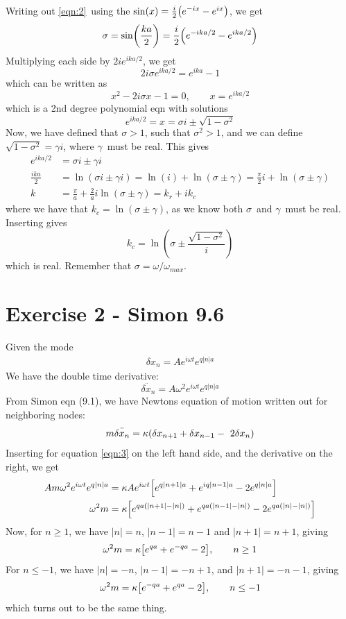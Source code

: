 \documentclass[12p,a4paper]{article}
\renewcommand{\exp}{e^}
\renewcommand{\exp}{e^}
\begin{document}
Writing out \ref{eqn:2} using the $\sin(x) = \frac{i}{2}\qty(\exp{-ix} - \exp{ix})$, we get
\[
    \sigma = \sin(\frac{ka}{2}) = \frac{i}{2}\qty(\exp{-ika/2} - \exp{ika/2})
\]
Multiplying each side by $2i\exp{ika/2}$, we get
\[
    2i\sigma\exp{ika/2} =  \exp{ika} - 1
\]
which can be written as 
\[
    x^2 - 2i\sigma x - 1 = 0, \quad\quad  x = \exp{ika/2}
\]
which is a 2nd degree polynomial eqn with solutions
\[
    \exp{ika/2} = x = \sigma i \pm \sqrt{1- \sigma^2}
\]
Now, we have defined that $\sigma > 1$, such that $\sigma^2 > 1$, and we can define $\sqrt{1-\sigma^2} = \gamma i$, where $\gamma$ must be real. This gives
\begin{align*}
    \exp{ika/2} &= \sigma i \pm \gamma i \\
    \frac{ika}{2} &= \ln(\sigma i \pm \gamma i) = \ln(i) + \ln(\sigma \pm \gamma) = \frac{\pi}{2}i + \ln(\sigma \pm \gamma) \\
    k &= \frac{\pi}{a} + \frac{2}{a}i \ln(\sigma \pm \gamma) = k_r + i k_c
\end{align*}
where we have that $k_c = \ln(\sigma \pm \gamma)$, as we know both $\sigma$ and $\gamma$ must be real.
Inserting gives
\[
    k_c = \ln(\sigma \pm \frac{\sqrt{1-\sigma^2}}{i})
\]
which is real. Remember that $\sigma = \omega/\omega_{max}$.


\section*{Exercise 2 - Simon 9.6}
Given the mode
\begin{align}\label{eqn:3}
    \delta x_n = A\exp{i\omega t}\exp{q|n|a}
\end{align}
We have the double time derivative:
\[
    \ddot{\delta x_n} = A\omega^2\exp{i\omega t}\exp{q|n|a}
\]
From Simon eqn (9.1), we have Newtons equation of motion written out for neighboring nodes:
\[
    m \ddot{\delta x_n} = \kappa\qty(\delta x_{n+1} + \delta x_{n-1} - 2\delta x_n)
\]
Inserting for equation \ref{eqn:3} on the left hand side, and the derivative on the right, we get
\begin{align*}
    Am\omega^2\exp{i\omega t}\exp{q|n|a} &= \kappa A\exp{i\omega t}\qty[\exp{q|n+1|a} + \exp{iq|n-1|a} - 2\exp{q|n|a}] \\
    \omega^2m &= \kappa\qty[\exp{qa(|n+1|-|n|)} + \exp{qa(|n-1|-|n|)} - 2\exp{qa(|n|-|n|)}] 
\end{align*}
Now, for $n \geq 1$, we have $|n| = n$, $|n-1| = n-1$ and $|n+1| = n+1$, giving
\[
    \omega^2m = \kappa\qty[\exp{qa} + \exp{-qa} - 2], \quad\quad n \geq 1
\]
For $n \leq -1$, we have $|n| = -n$, $|n-1| = -n+1$, and $|n+1| = -n-1$, giving
\[
    \omega^2m = \kappa\qty[\exp{-qa} + \exp{qa} - 2], \quad\quad n \leq -1
\]
which turns out to be the same thing.
\end{document}

